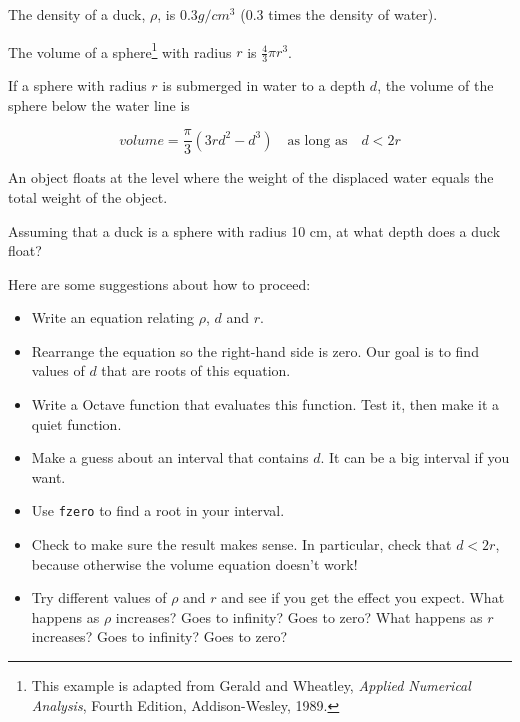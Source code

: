 \documentclass{book}
\begin{document}
\begin{ex}
\label{duck}

The density of a duck, $\rho$, is $0.3 g / cm^3$ (0.3 times the
density of water).

The volume of a sphere\footnote{This example is adapted from Gerald
and Wheatley, {\em Applied Numerical Analysis}, Fourth Edition,
Addison-Wesley, 1989.} with radius $r$ is $\frac{4}{3} \pi r^3$.

If a sphere with radius $r$ is submerged in water to a depth $d$, the
volume of the sphere below the water line is 

\[ volume = \frac{\pi}{3} (3r d^2 - d^3) \quad 
\mbox{as long as} \quad d < 2 r \]

An object floats at the level where the weight of the displaced water
equals the total weight of the object.

Assuming that a duck is a sphere with radius 10 cm, at what depth does
a duck float?

Here are some suggestions about how to proceed:

\begin{itemize}

\item Write an equation relating $\rho$, $d$ and $r$.

\item Rearrange the equation so the right-hand side is zero.
Our goal is to find values of $d$ that are roots of this equation.

\item Write a Octave function that evaluates this function. Test it,
  then make it a quiet function.

\item Make a guess about an interval that contains $d$. It can be a big
interval if you want.

\item Use {\tt fzero} to find a root in your interval.

\item Check to make sure the result makes sense. In particular,
  check that $d < 2 r$, because otherwise the volume equation
  doesn't work!

\item Try different values of $\rho$ and $r$ and see if you get the
effect you expect. What happens as $\rho$ increases? Goes to
infinity? Goes to zero? What happens as $r$ increases? Goes to
infinity? Goes to zero?

\end{itemize}


\end{ex}
\end{document}
